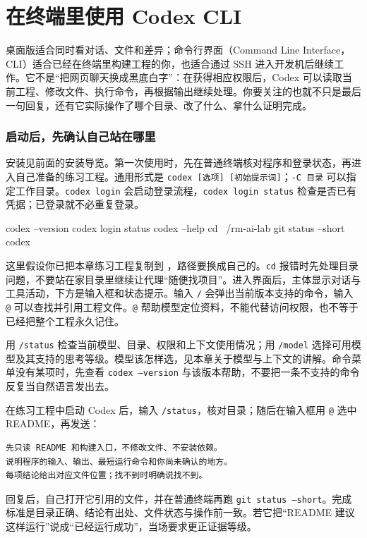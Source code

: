 \section{在终端里使用 Codex CLI}
\label{sec:ai-cli}

桌面版适合同时看对话、文件和差异；命令行界面（Command Line Interface，CLI）适合已经在终端里构建工程的你，也适合通过 SSH 进入开发机后继续工作。它不是“把网页聊天换成黑底白字”：在获得相应权限后，Codex 可以读取当前工程、修改文件、执行命令，再根据输出继续处理。你要关注的也就不只是最后一句回复，还有它实际操作了哪个目录、改了什么、拿什么证明完成。

\subsubsection{启动后，先确认自己站在哪里}

安装见前面的安装导览。第一次使用时，先在普通终端核对程序和登录状态，再进入自己准备的练习工程。通用形式是 \texttt{codex [选项] [初始提示词]}；\texttt{-C 目录} 可以指定工作目录。\texttt{codex login} 会启动登录流程，\texttt{codex login status} 检查是否已有凭据；已登录就不必重复登录。

\begin{tbash}
codex --version
codex login status
codex --help
cd ~/rm-ai-lab
git status --short
codex
\end{tbash}

这里假设你已把本章练习工程复制到 ，路径要换成自己的。\texttt{cd} 报错时先处理目录问题，不要站在家目录里继续让代理“随便找项目”。进入界面后，主体显示对话与工具活动，下方是输入框和状态提示。输入 \texttt{/} 会弹出当前版本支持的命令，输入 \texttt{@} 可以查找并引用工程文件。\texttt{@} 帮助模型定位资料，不能代替访问权限，也不等于已经把整个工程永久记住。

用 \texttt{/status} 检查当前模型、目录、权限和上下文使用情况；用 \texttt{/model} 选择可用模型及其支持的思考等级。模型该怎样选，见本章关于模型与上下文的讲解。命令菜单没有某项时，先查看 \texttt{codex --version} 与该版本帮助，不要把一条不支持的命令反复当自然语言发出去。

\begin{example}[第一次对话只读工程]
在练习工程中启动 Codex 后，输入 \texttt{/status}，核对目录；随后在输入框用 \texttt{@} 选中 README，再发送：
\begin{lstlisting}[language={}]
先只读 README 和构建入口，不修改文件、不安装依赖。
说明程序的输入、输出、最短运行命令和你尚未确认的地方。
每项结论给出对应文件位置；找不到时明确说找不到。
\end{lstlisting}
回复后，自己打开它引用的文件，并在普通终端再跑 \texttt{git status --short}。完成标准是目录正确、结论有出处、文件状态与操作前一致。若它把“README 建议这样运行”说成“已经运行成功”，当场要求更正证据等级。
\end{example}

